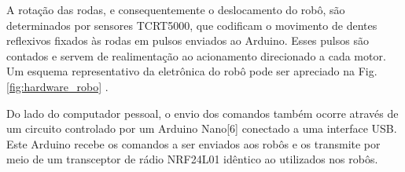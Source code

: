 A rotação das rodas, e consequentemente o deslocamento do robô, são determinados por sensores TCRT5000, que codificam o movimento de dentes reflexivos fixados às rodas em pulsos enviados ao Arduino. Esses pulsos são contados e servem de realimentação ao acionamento direcionado a cada motor. Um esquema representativo da eletrônica do robô pode ser apreciado na Fig. \ref{fig:hardware_robo} .

Do lado do computador pessoal, o envio dos comandos também ocorre através de um circuito controlado por um Arduino Nano[6] conectado a uma interface USB. Este Arduino recebe os comandos a ser enviados aos robôs e os transmite por meio de um transceptor de rádio NRF24L01 idêntico ao utilizados nos robôs.
